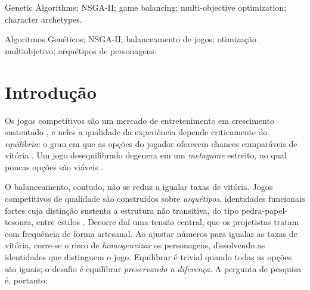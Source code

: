 \documentclass[10pt,conference]{IEEEtran}
\begin{document}
\renewcommand{\IEEEkeywordsname}{Keywords}
\begin{IEEEkeywords}
Genetic Algorithms; NSGA-II; game balancing; multi-objective optimization;
character archetypes.
\end{IEEEkeywords}

\renewcommand{\abstractname}{Resumo}

\begin{abstract}
Este trabalho em andamento investiga se um Algoritmo Genético é capaz de equilibrar
cinco arquétipos de um jogo de luta \emph{sem destruir suas identidades
funcionais}. A identidade é \emph{medida}, não imposta: o desvio em relação a um
perfil canônico é penalizado de forma suave e o ciclo de vantagens é reportado
\emph{post hoc}, o que evita uma pergunta de pesquisa circular. Equilíbrio e
identidade são otimizados como objetivos, por um AG escalar e pelo NSGA-II. Os resultados preliminares mostram
que o \emph{roster} canônico é fortemente desequilibrado, com \eqCan{} de 10
confrontos equilibrados. Otimizar o equilíbrio diretamente alcança os \eqAg{}, mas
homogeneíza o elenco, que preserva \valAg{} de \valTotal{} asserções. As soluções da
fronteira de Pareto mantêm até \valKnee{} de \valTotal{}. A fronteira torna o
\emph{trade-off} explícito e mensurável.
\end{abstract}

\renewcommand\IEEEkeywordsname{Palavras-chave}
\begin{IEEEkeywords}
Algoritmos Genéticos; NSGA-II; balanceamento de jogos; otimização multiobjetivo;
arquétipos de personagens.
\end{IEEEkeywords}

\IEEEpeerreviewmaketitle


\section{Introdução}

Os jogos competitivos são um mercado de entretenimento em crescimento sustentado
\cite{newzoo2025}, e neles a qualidade da experiência depende criticamente do
\emph{equilíbrio}: o grau em que as opções do jogador oferecem chances comparáveis
de vitória \cite{adams2014fundamentals}. Um jogo desequilibrado
degenera em um \emph{metagame} estreito, no qual poucas opções são viáveis
\cite{sirlin2006playing}.

O balanceamento, contudo, não se reduz a igualar taxas de vitória. Jogos
competitivos de qualidade são construídos sobre \emph{arquétipos}, identidades
funcionais fortes cuja distinção sustenta a estrutura não transitiva, do tipo
pedra-papel-tesoura, entre estilos \cite{gingold2006rps, elias2012characteristics}.
Decorre daí uma tensão central, que os projetistas tratam com frequência de forma
artesanal. Ao ajustar números para igualar as taxas de vitória, corre-se o risco de
\emph{homogeneizar} os personagens, dissolvendo as identidades que distinguem o
jogo. Equilibrar é trivial quando todas as opções são iguais; o desafio é
equilibrar \emph{preservando a diferença}. A pergunta de pesquisa é, portanto:
\end{document}
